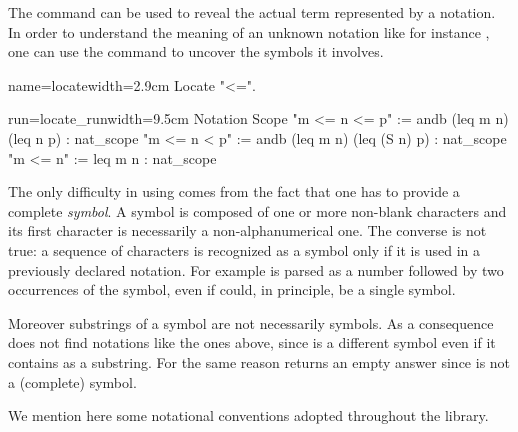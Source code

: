 The  command can be used to reveal the actual term
represented by a notation.  In order to understand the meaning of an unknown notation like for instance , one can use the  command to uncover the symbols it involves.

\begin{coq}{name=locate}{width=2.9cm}
Locate "<=".
\end{coq}
\begin{coqout}{run=locate_run}{width=9.5cm}
Notation                                       Scope
"m <= n <= p" := andb (leq m n) (leq n p)    : nat_scope
"m <= n < p" := andb (leq m n) (leq (S n) p) : nat_scope
"m <= n" := leq m n                          : nat_scope
\end{coqout}

The only difficulty in using  comes from the fact
that one has to provide a complete \emph{symbol}.  A symbol
is composed of one or more non-blank characters and its first
character is necessarily a non-alphanumerical one.
The converse is not true: a sequence of characters is recognized as
a symbol only if it is used in a previously declared notation.
For example  is parsed as a number followed by two
occurrences of the  symbol, even if  could, in
principle, be a single symbol.

Moreover substrings of a symbol are not necessarily symbols.  As a consequence
 does not find notations like the ones above, since \C{<=} is a
different symbol even if it contains \C{=} as a substring.  For the same reason
 returns an empty answer since  is not a (complete)
symbol.

We mention here some notational conventions
adopted throughout the \mcbMC{} library.


